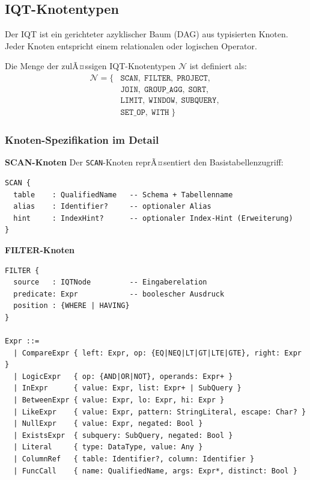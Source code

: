 \subsection{IQT-Knotentypen}
\label{subsec:iqt_knoten}

Der IQT ist ein gerichteter azyklischer Baum (DAG) aus typisierten Knoten.
Jeder Knoten entspricht einem relationalen oder logischen Operator.

\begin{definition}
\label{def:iqt_knoten}
Die Menge der zulÃ¤ssigen IQT-Knotentypen $\mathcal{N}$ ist definiert als:
\begin{align*}
\mathcal{N} = \{
  &\mathtt{SCAN},\; \mathtt{FILTER},\; \mathtt{PROJECT},\; \\
  &\mathtt{JOIN},\; \mathtt{GROUP\_AGG},\; \mathtt{SORT},\; \\
  &\mathtt{LIMIT},\; \mathtt{WINDOW},\; \mathtt{SUBQUERY},\; \\
  &\mathtt{SET\_OP},\; \mathtt{WITH}\;\}
\end{align*}
\end{definition}

\subsubsection{Knoten-Spezifikation im Detail}

\textbf{SCAN-Knoten}
Der \texttt{SCAN}-Knoten reprÃ¤sentiert den Basistabellenzugriff:

\begin{lstlisting}[style=sqlstyle, caption={IQT-Pseudonotation: SCAN},
  label=lst:iqt_scan]
SCAN {
  table    : QualifiedName   -- Schema + Tabellenname
  alias    : Identifier?     -- optionaler Alias
  hint     : IndexHint?      -- optionaler Index-Hint (Erweiterung)
}
\end{lstlisting}

\textbf{FILTER-Knoten}
\begin{lstlisting}[style=sqlstyle, caption={IQT-Pseudonotation: FILTER},
  label=lst:iqt_filter]
FILTER {
  source   : IQTNode         -- Eingaberelation
  predicate: Expr            -- boolescher Ausdruck
  position : {WHERE | HAVING}
}

Expr ::=
  | CompareExpr { left: Expr, op: {EQ|NEQ|LT|GT|LTE|GTE}, right: Expr }
  | LogicExpr   { op: {AND|OR|NOT}, operands: Expr+ }
  | InExpr      { value: Expr, list: Expr+ | SubQuery }
  | BetweenExpr { value: Expr, lo: Expr, hi: Expr }
  | LikeExpr    { value: Expr, pattern: StringLiteral, escape: Char? }
  | NullExpr    { value: Expr, negated: Bool }
  | ExistsExpr  { subquery: SubQuery, negated: Bool }
  | Literal     { type: DataType, value: Any }
  | ColumnRef   { table: Identifier?, column: Identifier }
  | FuncCall    { name: QualifiedName, args: Expr*, distinct: Bool }
\end{lstlisting}


